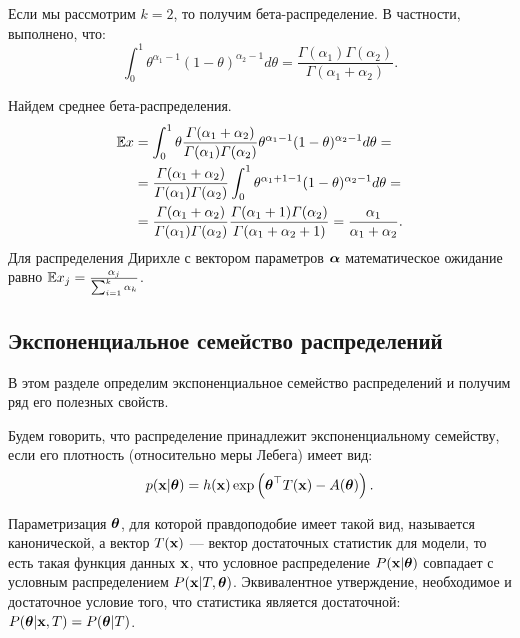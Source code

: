 Если мы рассмотрим $k = 2$, то получим бета-распределение.
В частности, выполнено, что:
\[
\int_0^1 \theta^{\alpha_1 - 1} (1 - \theta)^{\alpha_2 - 1} d\theta =  \frac{\Gamma(\alpha_1) \Gamma(\alpha_2)}{\Gamma(\alpha_1 + \alpha_2)}.
\]

\begin{example}
Найдем среднее бета-распределения.
\begin{align*}
\mathbb{E} x &= \int_0^1 \theta \frac{\varGamma(\alpha_1 + \alpha_2)}{\varGamma(\alpha_1) \varGamma(\alpha_2)} \theta^{\alpha_1 - 1} (1 - \theta)^{\alpha_2 - 1}d\theta = \\
&= \frac{\varGamma(\alpha_1 + \alpha_2)}{\varGamma(\alpha_1) \varGamma(\alpha_2)} \int_0^1 \theta^{\alpha_1 + 1 - 1} (1 - \theta)^{\alpha_2 - 1}d\theta = \\
&= \frac{\varGamma(\alpha_1 + \alpha_2)}{\varGamma(\alpha_1) \varGamma(\alpha_2)} 
   \frac{\varGamma(\alpha_1 + 1) \varGamma(\alpha_2)}{\varGamma(\alpha_1 + \alpha_2 + 1)} = \frac{\alpha_1}{\alpha_1 + \alpha_2}.
\end{align*}
Для распределения Дирихле с вектором параметров $\boldsymbol{\alpha}$ математическое ожидание равно $\mathbb{E} x_j = \frac{\alpha_j}{\sum_{i = 1}^k \alpha_k}$.

\end{example}

\subsection{Экспоненциальное семейство распределений}
\label{sec:exp_family}

В этом разделе определим экспоненциальное семейство распределений и получим ряд его полезных свойств.
\begin{Definition}
Будем говорить, что распределение принадлежит экспоненциальному семейству, если
его плотность (относительно меры Лебега) имеет вид:
\[
p(\mathbf{x} | \boldsymbol{\theta}) = h(\mathbf{x}) \exp \left(\boldsymbol{\theta}^\top T(\mathbf{x}) - A(\boldsymbol{\theta}) \right).
\]
\end{Definition}

Параметризация $\boldsymbol{\theta}$, для которой правдоподобие имеет такой вид, называется канонической, 
а вектор $T(\mathbf{x})$ --- вектор достаточных статистик для модели, то есть такая функция данных $\mathbf{x}$, что
условное распределение $P(\mathbf{x} | \boldsymbol{\theta})$ совпадает с условным распределением $P(\mathbf{x} | T, \boldsymbol{\theta})$.
Эквивалентное утверждение, необходимое и достаточное условие того, что статистика является достаточной: $P(\boldsymbol{\theta} | \mathbf{x}, T) = P(\boldsymbol{\theta} | T)$.

